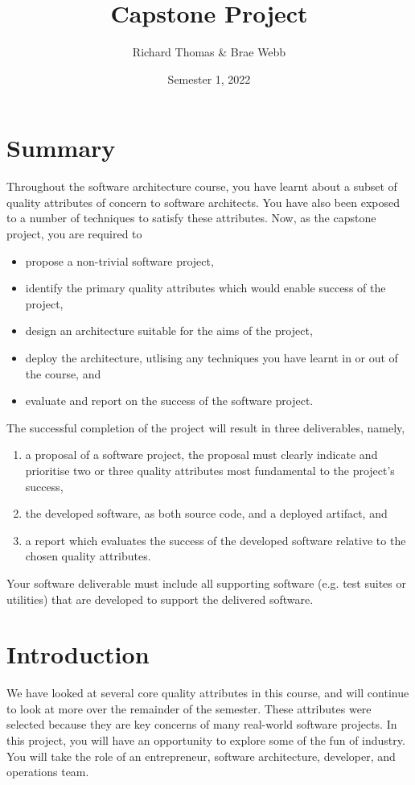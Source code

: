 \documentclass{csse4400}
\title{Capstone Project}
\author{Richard Thomas \& Brae Webb}
\date{Semester 1, 2022}
\begin{document}
\maketitle

\section*{Summary}
Throughout the software architecture course,
you have learnt about a subset of quality attributes of concern to software architects.
You have also been exposed to a number of techniques to satisfy these attributes.
Now, as the capstone project, you are required to
\begin{itemize}
    \item propose a non-trivial software project,
    \item identify the primary quality attributes which would enable success of the project,
    \item design an architecture suitable for the aims of the project,
    \item deploy the architecture, utlising any techniques you have learnt in or out of the course, and
    \item evaluate and report on the success of the software project.
\end{itemize}

\noindent
The successful completion of the project will result in three deliverables, namely,
\begin{enumerate}[label=\roman*]
    \item a proposal of a software project, the proposal must clearly indicate and prioritise two or three quality attributes most {\color{red} fundamental} to the project's success,
    \item the developed software, as both source code, and a deployed artifact, and
    \item a report which evaluates the success of the developed software relative to the chosen quality attributes.
\end{enumerate}

\noindent
Your software deliverable must include all supporting software (e.g. test suites or utilities) that are developed to support the delivered software.

\section{Introduction}
We have looked at several core quality attributes in this course, and will continue to look at more over the remainder of the semester.
These attributes were selected because they are key concerns of many real-world software projects.
In this project, you will have an opportunity to explore some of the fun of industry.
You will take the role of an entrepreneur, software architecture, developer, and operations team.
\end{document}
